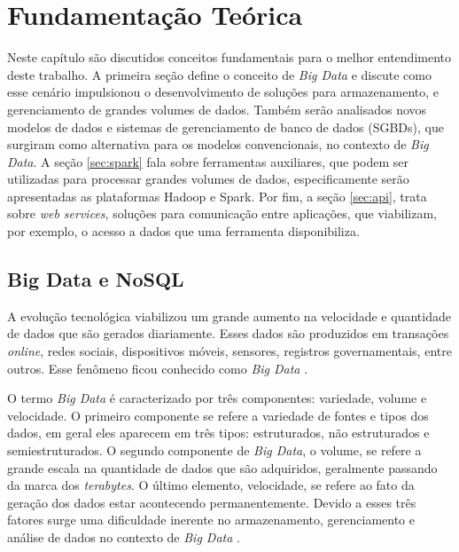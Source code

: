 
\chapter{Fundamentação Teórica}
\label{chap:fundamentacaoTeorica}

Neste capítulo são discutidos conceitos fundamentais para o melhor entendimento deste 
trabalho. A primeira seção define o conceito de \textit{Big Data} e discute como esse 
cenário impulsionou o desenvolvimento de soluções para armazenamento, e gerenciamento de 
grandes volumes de dados. Também serão analisados novos modelos de dados e sistemas de 
gerenciamento de banco de dados (SGBDs), que surgiram como alternativa para os modelos 
convencionais, no contexto de \textit{Big Data}. A seção \ref{sec:spark} fala 
sobre ferramentas auxiliares, que podem ser utilizadas para processar grandes volumes de dados,
especificamente serão apresentadas as plataformas Hadoop e Spark. Por fim, a seção 
\ref{sec:api}, trata sobre \textit{web services}, soluções para comunicação entre aplicações, 
que viabilizam, por exemplo, o acesso a dados que uma ferramenta disponibiliza. 

\section{Big Data e NoSQL}
\label{sec:bigdata}

A evolução tecnológica viabilizou um grande aumento na velocidade e quantidade de dados que 
são gerados diariamente. Esses dados são produzidos em transações \textit{online}, redes sociais, 
dispositivos móveis, sensores, registros governamentais, entre outros. Esse fenômeno ficou 
conhecido como \textit{Big Data} \cite{sagiroglu2013big}. 

O termo \textit{Big Data} é caracterizado por três componentes: variedade, volume e velocidade. 
O primeiro componente se refere a variedade de fontes e tipos dos dados, em geral eles 
aparecem em três tipos: estruturados, não estruturados e semiestruturados. O segundo componente 
de \textit{Big Data}, o volume, se refere a grande escala na quantidade de dados que são 
adquiridos, geralmente passando da marca dos \textit{terabytes}. O último elemento, 
velocidade, se refere ao fato da geração dos dados estar acontecendo permanentemente. Devido 
a esses três fatores surge uma dificuldade inerente no armazenamento, gerenciamento e 
análise de dados no contexto de \textit{Big Data} \cite{sagiroglu2013big}.

